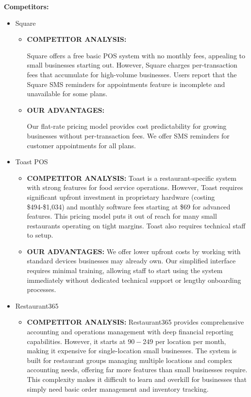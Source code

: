 \documentclass[]{VUMIFTemplateClass}
\begin{document}
\textbf{Competitors:}

\begin{itemize}
    \item Square
\begin{itemize}
        \item \textbf{COMPETITOR ANALYSIS:}
        
        Square offers a free basic POS system with no monthly fees, appealing to
        small businesses starting out. However, Square charges per-transaction
        fees that accumulate for high-volume businesses. Users report that the Square SMS reminders for appointments feature is incomplete and unavailable for some plans.

        \item \textbf{OUR ADVANTAGES:} 
        
        Our flat-rate pricing model provides cost predictability for growing
        businesses without per-transaction fees. We offer SMS reminders for customer appointments for all plans.

    \end{itemize}
    

    \item {Toast POS}
    \begin{itemize}
        \item  \textbf{COMPETITOR ANALYSIS:}
        Toast is a restaurant-specific system with strong
        features for food service operations. However, Toast requires significant
        upfront investment in proprietary hardware (costing \$494-\$1,034) and monthly
        software fees starting at \$69 for advanced features. This pricing model
        puts it out of reach for many small restaurants operating on tight margins.
        Toast also requires technical staff to setup.

        \item  \textbf{OUR ADVANTAGES:} 
        We offer lower upfront costs by working with
        standard devices businesses may already own. Our simplified interface
        requires minimal training, allowing staff to start using the system
        immediately without dedicated technical support or lengthy onboarding
        processes.
    \end{itemize}
    
    \item Restaurant365
    \begin{itemize}
        \item \textbf{COMPETITOR ANALYSIS:}
        Restaurant365 provides comprehensive
        accounting and operations management with deep financial reporting
        capabilities. However, it starts at $90-$249 per location per month, making
        it expensive for single-location small businesses. The system is built for
        restaurant groups managing multiple locations and complex accounting needs,
        offering far more features than small businesses require. This complexity
        makes it difficult to learn and overkill for businesses that simply need
        basic order management and inventory tracking.


\end{itemize}
\end{itemize}
\end{document}
